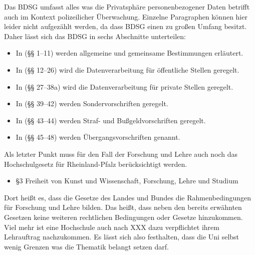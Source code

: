 \documentclass[10pt,a4paper]{article}
\begin{document}
Das BDSG umfasst alles was die Privatsphäre personenbezogener Daten betrifft auch im Kontext polizeilicher Überwachung. Einzelne Paragraphen können hier leider nicht aufgezählt werden, da dass BDSG einen zu großen Umfang besitzt. Daher lässt sich das BDSG in sechs Abschnitte unterteilen:
\begin{itemize}
	\item In (§§ 1–11) werden allgemeine und gemeinsame Bestimmungen erläutert.
	\item In (§§ 12–26) wird die Datenverarbeitung für öffentliche Stellen geregelt.
	\item In (§§ 27–38a) wird die Datenverarbeitung für private Stellen geregelt.
	\item In (§§ 39–42) werden Sondervorschriften geregelt.
	\item In (§§ 43–44) werden Straf- und Bußgeldvorschriften geregelt.
	\item In (§§ 45–48) werden Übergangsvorschriften genannt.
\end{itemize}
\newpage
Als letzter Punkt muss für den Fall der Forschung und Lehre auch noch das Hochschulgesetz für Rheinland-Pfalz berücksichtigt werden. 
\begin{itemize}
	\item §3 Freiheit von Kunst und Wissenschaft, Forschung, Lehre und Studium
\end{itemize}
Dort heißt es, dass die Gesetze des Landes und Bundes die Rahmenbedingungen für Forschung und Lehre bilden. Das heißt, dass neben den bereits erwähnten Gesetzen keine weiteren rechtlichen Bedingungen oder Gesetze hinzukommen. Viel mehr ist eine Hochschule auch nach XXX dazu verpflichtet ihrem Lehrauftrag nachzukommen. Es lässt sich also festhalten, dass die Uni selbst wenig Grenzen was die Thematik belangt setzen darf.
\end{document}

